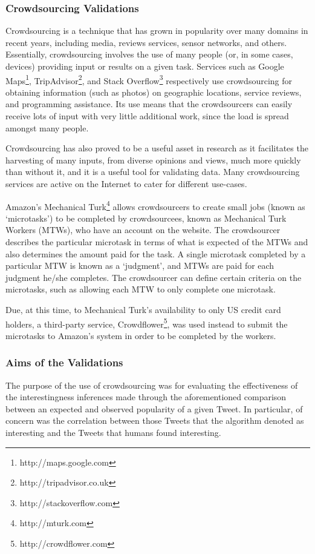 \subsubsection{Crowdsourcing Validations}
Crowdsourcing is a technique that has grown in popularity over many domains in recent years, including  media, reviews services, sensor networks, and others. Essentially, crowdsourcing involves the use of many people (or, in some cases, devices) providing input or results on a given task. Services such as Google Maps\footnote{http://maps.google.com}, TripAdvisor\footnote{http://tripadvisor.co.uk}, and Stack Overflow\footnote{http://stackoverflow.com} respectively use crowdsourcing for obtaining information (such as photos) on geographic locations, service reviews, and programming assistance. Its use means that the crowdsourcers can easily receive lots of input with very little additional work, since the load is spread amongst many people.

Crowdsourcing has also proved to be a useful asset in research as it facilitates the harvesting of many inputs, from diverse opinions and views, much more quickly than without it, and it is a useful tool for validating data. Many crowdsourcing services are active on the Internet to cater for different use-cases.

Amazon's Mechanical Turk\footnote{http://mturk.com} allows crowdsourcers to create small jobs (known as `microtasks') to be completed by crowdsourcees, known as Mechanical Turk Workers (MTWs), who have an account on the website. The crowdsourcer describes the particular microtask in terms of what is expected of the MTWs and also determines the amount paid for the task. A single microtask completed by a particular MTW is known as a `judgment', and MTWs are paid for each judgment he/she completes. The crowdsourcer can define certain criteria on the microtasks, such as allowing each MTW to only complete one microtask.

Due, at this time, to Mechanical Turk's availability to only US credit card holders, a third-party service, Crowdflower\footnote{http://crowdflower.com}, was used instead to submit the microtasks to Amazon's system in order to be completed by the workers. 


\subsubsection{Aims of the Validations}
The purpose of the use of crowdsourcing was for evaluating the effectiveness of the interestingness inferences made through the aforementioned comparison between an expected and observed popularity of a given Tweet. In particular, of concern was the correlation between those Tweets that the algorithm denoted as interesting and the Tweets that humans found interesting.


